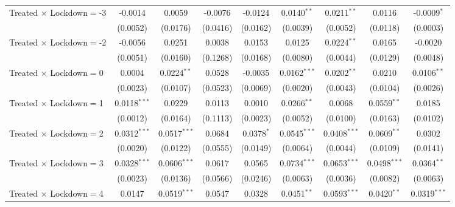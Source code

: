 \begin{tabular}{lcccccccc}
   Treated $\times$ Lockdown$=$-3 & -0.0014        & 0.0059         & -0.0076       & -0.0124        & 0.0140$^{**}$  & 0.0211$^{**}$  & 0.0116         & -0.0009$^{*}$\\
                                   & (0.0052)       & (0.0176)       & (0.0416)      & (0.0162)       & (0.0039)       & (0.0052)       & (0.0118)       & (0.0003)\\
   Treated $\times$ Lockdown$=$-2 & -0.0056        & 0.0251         & 0.0038        & 0.0153         & 0.0125         & 0.0224$^{**}$  & 0.0165         & -0.0020\\
                                   & (0.0051)       & (0.0160)       & (0.1268)      & (0.0168)       & (0.0080)       & (0.0044)       & (0.0129)       & (0.0048)\\
   Treated $\times$ Lockdown$=$0  & 0.0004         & 0.0224$^{**}$  & 0.0528        & -0.0035        & 0.0162$^{***}$ & 0.0202$^{**}$  & 0.0210         & 0.0106$^{**}$\\
                                   & (0.0023)       & (0.0107)       & (0.0523)      & (0.0069)       & (0.0020)       & (0.0043)       & (0.0104)       & (0.0026)\\
   Treated $\times$ Lockdown$=$1  & 0.0118$^{***}$ & 0.0229         & 0.0113        & 0.0010         & 0.0266$^{**}$  & 0.0068         & 0.0559$^{**}$  & 0.0185\\
                                   & (0.0012)       & (0.0164)       & (0.1113)      & (0.0023)       & (0.0052)       & (0.0100)       & (0.0163)       & (0.0102)\\
   Treated $\times$ Lockdown$=$2  & 0.0312$^{***}$ & 0.0517$^{***}$ & 0.0684        & 0.0378$^{*}$   & 0.0545$^{***}$ & 0.0408$^{***}$ & 0.0609$^{**}$  & 0.0302\\
                                   & (0.0020)       & (0.0122)       & (0.0555)      & (0.0149)       & (0.0064)       & (0.0044)       & (0.0109)       & (0.0141)\\
   Treated $\times$ Lockdown$=$3  & 0.0328$^{***}$ & 0.0606$^{***}$ & 0.0617        & 0.0565         & 0.0734$^{***}$ & 0.0653$^{***}$ & 0.0498$^{***}$ & 0.0364$^{**}$\\
                                   & (0.0023)       & (0.0136)       & (0.0566)      & (0.0246)       & (0.0063)       & (0.0036)       & (0.0082)       & (0.0063)\\
   Treated $\times$ Lockdown$=$4  & 0.0147         & 0.0519$^{***}$ & 0.0547        & 0.0328         & 0.0451$^{**}$  & 0.0593$^{***}$ & 0.0420$^{**}$  & 0.0319$^{***}$\\

\end{tabular}
